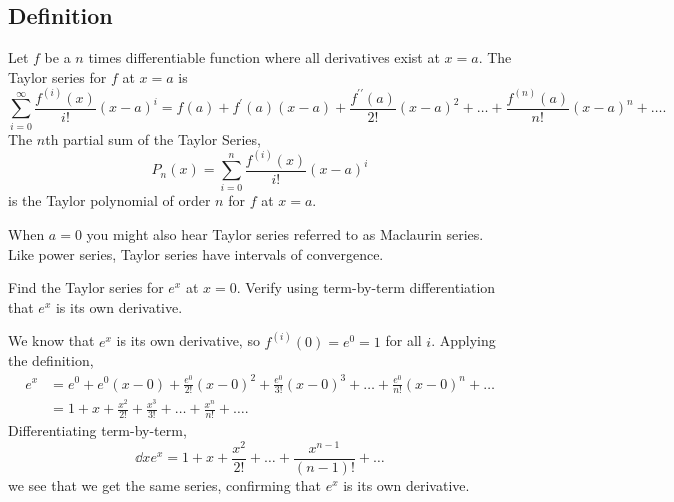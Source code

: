 \subsection{Definition}
\begin{definition}
	Let $f$ be a $n$ times differentiable function where all derivatives exist at $x=a$.
	The Taylor series for $f$ at $x=a$ is
	\begin{equation*}
		\sum_{i=0}^{\infty}{\frac{f^{(i)}(x)}{i!}(x-a)^i} = f(a) + f^\prime(a)(x-a) + \frac{f^{\prime\prime}(a)}{2!}(x-a)^2 + \ldots + \frac{f^{(n)}(a)}{n!}(x-a)^n + \ldots.
	\end{equation*}
	The $n$th partial sum of the Taylor Series,
	\begin{equation*}
		P_n(x) = \sum_{i=0}^{n}{\frac{f^{(i)}(x)}{i!}(x-a)^i}
	\end{equation*}
	is the Taylor polynomial of order $n$ for $f$ at $x=a$.
\end{definition}
\noindent
When $a=0$ you might also hear Taylor series referred to as Maclaurin series.
Like power series, Taylor series have intervals of convergence.

\begin{example}
	Find the Taylor series for $e^x$ at $x=0$.
	Verify using term-by-term differentiation that $e^x$ is its own derivative.
\end{example}
We know that $e^x$ is its own derivative, so $f^{(i)}(0)=e^0 = 1$ for all $i$.
Applying the definition,
\begin{align*}
	e^x &= e^0 + e^0(x-0) + \frac{e^0}{2!}(x-0)^2 + \frac{e^0}{3!}(x-0)^3 + \ldots + \frac{e^0}{n!}(x-0)^n + \ldots \\
	&= 1 + x + \frac{x^2}{2!} + \frac{x^3}{3!} + \ldots + \frac{x^n}{n!} + \ldots.
\end{align*}
\indent
Differentiating term-by-term,
\begin{equation*}
	\dd{}{x}e^x = 1 + x + \frac{x^2}{2!} + \ldots + \frac{x^{n-1}}{(n-1)!} + \ldots
\end{equation*}
we see that we get the same series, confirming that $e^x$ is its own derivative.

